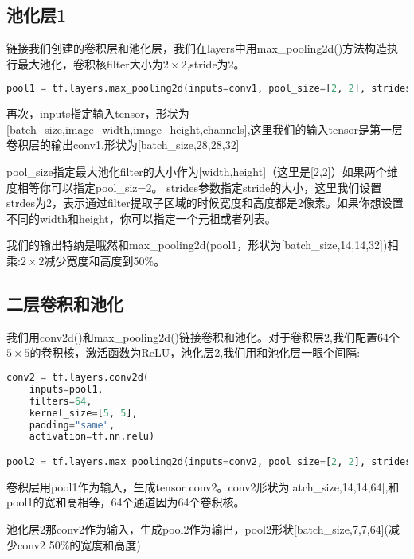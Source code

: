 \subsection{池化层1}
链接我们创建的卷积层和池化层，我们在layers中用max\_pooling2d()方法构造执行最大池化，卷积核filter大小为$2\times2$,stride为2。
\begin{lstlisting}[language=Python]
pool1 = tf.layers.max_pooling2d(inputs=conv1, pool_size=[2, 2], strides=2)
\end{lstlisting}
再次，inputs指定输入tensor，形状为[batch\_size,image\_width,image\_height,channels],这里我们的输入tensor是第一层卷积层的输出conv1,形状为[batch\_size,28,28,32]

pool\_size指定最大池化filter的大小作为[width,height]（这里是[2,2]）如果两个维度相等你可以指定pool\_siz=2。
strides参数指定stride的大小，这里我们设置strdes为2，表示通过filter提取子区域的时候宽度和高度都是2像素。如果你想设置不同的width和height，你可以指定一个元祖或者列表。

我们的输出特纳是哦然和max\_pooling2d(pool1，形状为[batch\_size,14,14,32])相乘:$2\times2$减少宽度和高度到50\%。
\subsection{二层卷积和池化}
我们用conv2d()和max\_pooling2d()链接卷积和池化。对于卷积层2,我们配置64个$5\times5$的卷积核，激活函数为ReLU，池化层2,我们用和池化层一眼个间隔:
\begin{lstlisting}[language=Python]
conv2 = tf.layers.conv2d(
    inputs=pool1,
    filters=64,
    kernel_size=[5, 5],
    padding="same",
    activation=tf.nn.relu)

pool2 = tf.layers.max_pooling2d(inputs=conv2, pool_size=[2, 2], strides=2)
\end{lstlisting}
卷积层用pool1作为输入，生成tensor conv2。conv2形状为[atch\_size,14,14,64],和pool1的宽和高相等，64个通道因为64个卷积核。

池化层2那conv2作为输入，生成pool2作为输出，pool2形状[batch\_size,7,7,64](减少conv2 50\%的宽度和高度)
